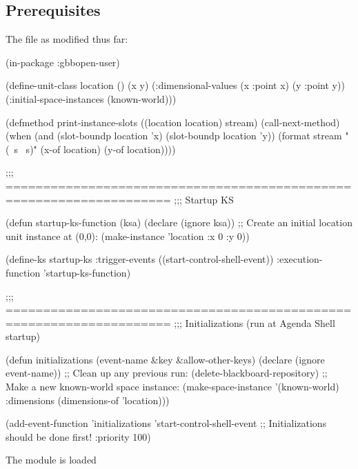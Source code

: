 \documentclass[10pt,twoside,english,pdftex]{article}
\begin{document}
\fndocrule

\subsection*{Prerequisites}

\begin{tightitemize}
\item The  file as modified thus far:
\end{tightitemize}
%
\W\supp
\begin{example}
  (in-package :gbbopen-user)

  (define-unit-class location ()
    (x y)
    (:dimensional-values
      (x :point x)
      (y :point y))
    (:initial-space-instances (known-world)))

  (defmethod print-instance-slots ((location location) stream)
    (call-next-method)
    (when (and (slot-boundp location 'x)
               (slot-boundp location 'y))
      (format stream " (~s ~s)"
              (x-of location)
              (y-of location))))

  ;;; ====================================================================
  ;;;   Startup KS

  (defun startup-ks-function (ksa)
    (declare (ignore ksa))
    ;; Create an initial location unit instance at (0,0):
    (make-instance 'location :x 0 :y 0))

  (define-ks startup-ks
      :trigger-events ((start-control-shell-event))
      :execution-function 'startup-ks-function)

  ;;; ====================================================================
  ;;;   Initializations (run at Agenda Shell startup)

  (defun initializations (event-name &key &allow-other-keys)
    (declare (ignore event-name))
    ;; Clean up any previous run:
    (delete-blackboard-repository)
    ;; Make a new known-world space instance:
    (make-space-instance 
     '(known-world)
     :dimensions (dimensions-of 'location)))

  (add-event-function 'initializations 'start-control-shell-event
                      ;; Initializations should be done first!
                      :priority 100)
\end{example}

\begin{tightitemize}
\item The  module is loaded
\end{tightitemize}
\end{document}
